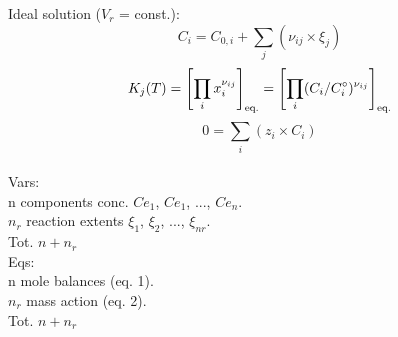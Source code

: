 \documentclass[12pt,a4paper,preview]{standalone}
\begin{document}
Ideal solution ($V_r$ = const.):
\begin{equation}
C_i = C_{0,i} + \sum_j(\nu_{ij} \times \xi_j)
\end{equation}
\begin{equation}
K_j(T) = \left[ \prod_ix_i^{\nu_{ij}} \right]_{\textnormal{eq.}}= 
\left[ \prod_i(C_i/C^{\circ}_i)^{\nu_{ij}} \right]_{\textnormal{eq.}}
\end{equation}
\begin{equation}
0 = \sum_i(z_i \times C_i)
\end{equation}
\\
Vars: \\
n components conc. $Ce_1$, $Ce_1$, ..., $Ce_n$. \\
$n_r$ reaction extents $\xi_1$, $\xi_2$, ..., $\xi_{nr}$. \\
Tot. $n + n_r$ \\
Eqs: \\
n mole balances (eq. 1). \\
$n_r$ mass action (eq. 2). \\
Tot. $n + n_r$
\end{document}
